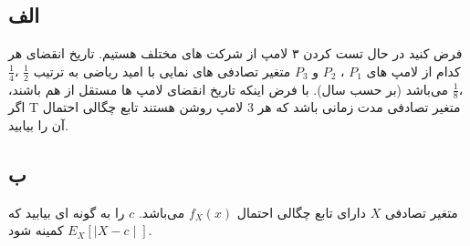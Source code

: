 \subsection*{الف}
فرض کنید در حال تست کردن ۳ لامپ از شرکت های مختلف هستیم. تاریخ انقضای هر کدام از لامپ های $P_1$ ، $P_2$ و $P_3$ متغیر تصادفی های نمایی با امید ریاضی به ترتیب 
$\frac{1}{2}$ ،$\frac{1}{4}$ ،$\frac{1}{8}$
می‌باشد (بر حسب سال). با فرض اینکه تاریخ انقضای لامپ ها مستقل از هم باشند، اگر T متغیر تصادفی مدت زمانی باشد که هر 3 لامپ روشن هستند تابع چگالی احتمال آن را بیابید.  


\subsection*{ب}
متغیر تصادفی $X$  دارای تابع چگالی احتمال $f_X(x)$  می‌باشد. $c$ را به گونه ای بیابید که
 $E_X[\mid X - c \mid ]$
 کمینه شود. 



